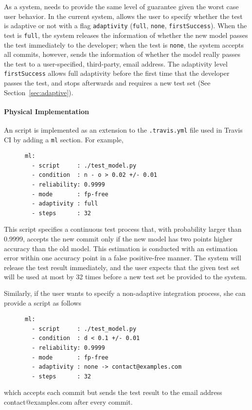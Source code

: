 \documentclass{article}
\begin{document}
As a system, \sys needs to provide the same level
of guarantee given the worst case user behavior.
In the current system, \sys allows the user to specify
whether the test is adaptive or not
with a flag \texttt{adaptivity} (\texttt{full},
\texttt{none}, \texttt{firstSuccess}). 
When the test is \texttt{full},
the system releases the information of whether 
the new model passes the test immediately to the developer;
when the test is \texttt{none}, the system accepts
all commits, however, sends the information of
whether the model really passes the test to
a user-specified, third-party, email address.
The adaptivity level \texttt{firstSuccess}
allows full adaptivity before the first time
that the developer passes the test, and stops
afterwards and requires a new test set (See Section~\ref{sec:adaptive}).

\paragraph*{Physical Implementation}
An \sys script is implemented as an 
extension to the \texttt{.travis.yml} file
used in Travis CI by adding a \texttt{ml} section.
For example,
\begin{verbatim}
      ml:
        - script     : ./test_model.py 
        - condition  : n - o > 0.02 +/- 0.01 
        - reliability: 0.9999
        - mode       : fp-free
        - adaptivity : full
        - steps      : 32
\end{verbatim}
This script specifies a continuous test process
that, with probability larger than 0.9999,
accepts the new commit only if the new model 
has two points higher accuracy than the old
model. This estimation is conducted with an 
estimation error within one accuracy point
in a false positive-free manner. The system 
will release the test result immediately,
and the user expects that the given test set
will be used at most by 32 times before
a new test set be provided to the system.

Similarly, if the user wants to specify a 
non-adaptive integration process, she can provide
a script as follows
\begin{verbatim}
      ml:
        - script     : ./test_model.py 
        - condition  : d < 0.1 +/- 0.01
        - reliability: 0.9999
        - mode       : fp-free
        - adaptivity : none -> contact@examples.com
        - steps      : 32
\end{verbatim}
which accepts each commit but sends
the test result to the email address 
contact@examples.com after every commit.
\end{document}
